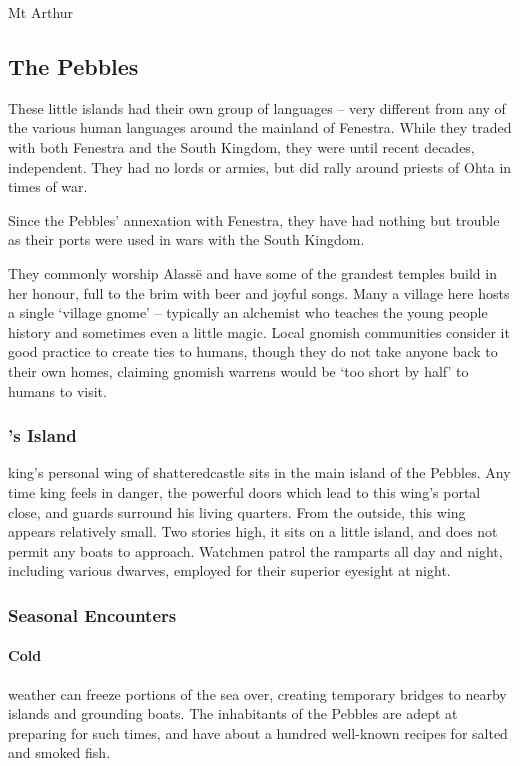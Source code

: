 \begin{multicols}{2}
{\begin{encounters}{Mt Arthur}
\end{encounters}
}

\subsection{The Pebbles}


These little islands had their own group of languages -- very different from any of the various human languages around the mainland of Fenestra.  While they traded with both Fenestra and the South Kingdom, they were until recent decades, independent.  They had no lords or armies, but did rally around priests of Ohta in times of war.

Since the Pebbles' annexation with Fenestra, they have had nothing but trouble as their ports were used in wars with the South Kingdom.

They commonly worship Alass\"{e} and have some of the grandest temples build in her honour, full to the brim with beer and joyful songs.
Many a village here hosts a single `village gnome' -- typically an alchemist who teaches the young people history and sometimes even a little magic.
Local gnomish communities consider it good practice to create ties to humans, though they do not take anyone back to their own homes, claiming gnomish warrens would be `too short by half' to humans to visit.

\subsubsection{'s Island}

\Gls{king}'s personal wing of \gls{shatteredcastle} sits in the main island of the Pebbles.
Any time \gls{king} feels in danger, the powerful doors which lead to this wing's portal close, and guards surround his living quarters.
From the outside, this wing appears relatively small.
Two stories high, it sits on a little island, and does not permit any boats to approach.
Watchmen patrol the ramparts all day and night, including various dwarves, employed for their superior eyesight at night.

\subsubsection{Seasonal Encounters}

\paragraph{Cold} weather can freeze portions of the sea over, creating temporary bridges to nearby islands and grounding boats.
The inhabitants of the Pebbles are adept at preparing for such times, and have about a hundred well-known recipes for salted and smoked fish.

\end{multicols}
